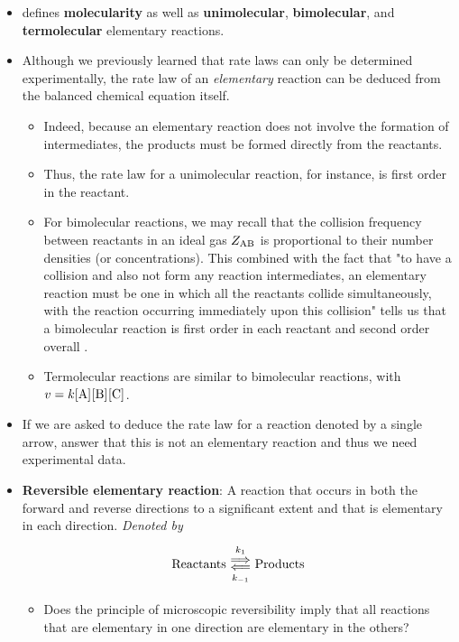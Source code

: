 \documentclass[../notes.tex]{subfiles}
\begin{document}
\begin{itemize}
    \item \textcite{bib:McQuarrieSimon} defines \textbf{molecularity} as well as \textbf{unimolecular}, \textbf{bimolecular}, and \textbf{termolecular} elementary reactions.
    \item Although we previously learned that rate laws can only be determined experimentally, the rate law of an \emph{elementary} reaction can be deduced from the balanced chemical equation itself.
    \begin{itemize}
        \item Indeed, because an elementary reaction does not involve the formation of intermediates, the products must be formed directly from the reactants.
        \item Thus, the rate law for a unimolecular reaction, for instance, is first order in the reactant.
        \item For bimolecular reactions, we may recall that the collision frequency between reactants in an ideal gas $Z_{\ce{A}\ce{B}}$ is proportional to their number densities (or concentrations). This combined with the fact that "to have a collision and also not form any reaction intermediates, an elementary reaction must be one in which all the reactants collide simultaneously, with the reaction occurring immediately upon this collision" tells us that a bimolecular reaction is first order in each reactant and second order overall \parencite[1182]{bib:McQuarrieSimon}.
        \item Termolecular reactions are similar to bimolecular reactions, with $v=k\cnc{A}\cnc{B}\cnc{C}$.
    \end{itemize}
    \item If we are asked to deduce the rate law for a reaction denoted by a single arrow, answer that this is not an elementary reaction and thus we need experimental data.
    \item \textbf{Reversible elementary reaction}: A reaction that occurs in both the forward and reverse directions to a significant extent and that is elementary in each direction. \emph{Denoted by}
    \begin{equation*}
        \text{Reactants} \Longleftrightarrows[k_1][k_{-1}] \text{Products}
    \end{equation*}
    \begin{itemize}
        \item Does the principle of microscopic reversibility imply that all reactions that are elementary in one direction are elementary in the others?
    \end{itemize}

\end{itemize}
\end{document}

